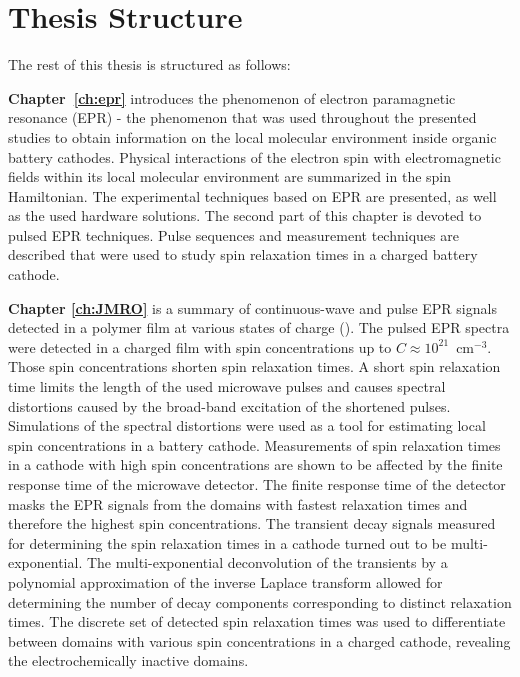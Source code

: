 \section{Thesis Structure}

The rest of this thesis is structured as follows:\\ 
\par
\textbf{Chapter~\ref{ch:epr}} introduces the phenomenon of electron paramagnetic resonance (EPR) - the phenomenon that was used throughout the presented studies to obtain information on the local molecular environment inside organic battery cathodes. Physical interactions of the electron spin with electromagnetic fields within its local molecular environment are summarized in the spin Hamiltonian. The experimental techniques based on EPR are presented, as well as the used hardware solutions. The second part of this chapter is devoted to pulsed EPR techniques. Pulse sequences and measurement techniques are described that were used to study spin relaxation times in a charged battery cathode.\\

\par
\textbf{Chapter \ref{ch:JMRO}} is a summary of continuous-wave and pulse EPR signals detected in a polymer  film at various states of charge (). The pulsed EPR spectra were detected in a charged film with spin concentrations up to $C\approx10^{21}$~cm$^{-3}$. Those spin concentrations shorten spin relaxation times. A short spin relaxation time limits the length of the used microwave pulses and causes spectral distortions caused by the broad-band excitation of the shortened pulses. Simulations of the spectral distortions were used as a tool for estimating local spin concentrations in a battery cathode. Measurements of spin relaxation times in a cathode with high spin concentrations are shown to be affected by the finite response time of the microwave detector. The finite response time of the detector masks the EPR signals from the domains with fastest relaxation times and therefore the highest spin concentrations. The transient decay signals measured for determining the spin relaxation times in a cathode turned out to be multi-exponential. The multi-exponential deconvolution of the transients by a polynomial approximation of the inverse Laplace transform allowed for determining the number of decay components corresponding to distinct relaxation times. The discrete set of detected spin relaxation times was used to differentiate between domains with various spin concentrations in a charged cathode, revealing the electrochemically inactive domains.


